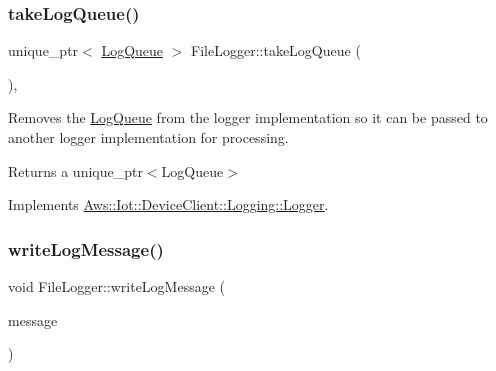 \mbox{\label{class_aws_1_1_iot_1_1_device_client_1_1_logging_1_1_file_logger_a5c55467d8f46332d6ef2acde379df2f7}} 
\subsubsection{\texorpdfstring{take\+Log\+Queue()}{takeLogQueue()}}
{\footnotesize\ttfamily unique\+\_\+ptr$<$ \hyperlink{class_aws_1_1_iot_1_1_device_client_1_1_logging_1_1_log_queue}{Log\+Queue} $>$ File\+Logger\+::take\+Log\+Queue (\begin{DoxyParamCaption}{ }\end{DoxyParamCaption})\hspace{0.3cm}{\ttfamily [override]}, {\ttfamily [virtual]}}



Removes the \hyperlink{class_aws_1_1_iot_1_1_device_client_1_1_logging_1_1_log_queue}{Log\+Queue} from the logger implementation so it can be passed to another logger implementation for processing. 

\begin{DoxyReturn}{Returns}
a unique\+\_\+ptr$<$\+Log\+Queue$>$ 
\end{DoxyReturn}


Implements \hyperlink{class_aws_1_1_iot_1_1_device_client_1_1_logging_1_1_logger_a39f3326be17f9ed4b1385f057134774d}{Aws\+::\+Iot\+::\+Device\+Client\+::\+Logging\+::\+Logger}.

\mbox{\label{class_aws_1_1_iot_1_1_device_client_1_1_logging_1_1_file_logger_aea84d831a8e014a164b85504dd755466}} 
\subsubsection{\texorpdfstring{write\+Log\+Message()}{writeLogMessage()}}
{\footnotesize\ttfamily void File\+Logger\+::write\+Log\+Message (\begin{DoxyParamCaption}\item[{std\+::unique\+\_\+ptr$<$ \hyperlink{class_aws_1_1_iot_1_1_device_client_1_1_logging_1_1_log_message}{Log\+Message} $>$}]{message }\end{DoxyParamCaption})\hspace{0.3cm}{\ttfamily [private]}}



